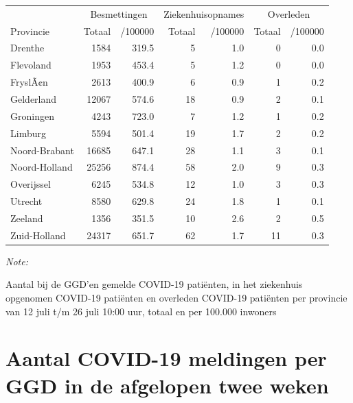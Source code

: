 \documentclass[
  english,
  man,floatsintext]{apa6}
\begin{document}
\begin{table}
\centering
\begin{threeparttable}
\begin{tabular}{lrrrrrr}
\toprule
\multicolumn{1}{c}{ } & \multicolumn{2}{c}{Besmettingen} & \multicolumn{2}{c}{Ziekenhuisopnames} & \multicolumn{2}{c}{Overleden} \\
\cmidrule(l{3pt}r{3pt}){2-3} \cmidrule(l{3pt}r{3pt}){4-5} \cmidrule(l{3pt}r{3pt}){6-7}
Provincie & Totaal & /100000 & Totaal & /100000 & Totaal & /100000\\
\midrule
Drenthe & 1584 & 319.5 & 5 & 1.0 & 0 & 0.0\\
Flevoland & 1953 & 453.4 & 5 & 1.2 & 0 & 0.0\\
FryslÃ¢n & 2613 & 400.9 & 6 & 0.9 & 1 & 0.2\\
Gelderland & 12067 & 574.6 & 18 & 0.9 & 2 & 0.1\\
Groningen & 4243 & 723.0 & 7 & 1.2 & 1 & 0.2\\
Limburg & 5594 & 501.4 & 19 & 1.7 & 2 & 0.2\\
Noord-Brabant & 16685 & 647.1 & 28 & 1.1 & 3 & 0.1\\
Noord-Holland & 25256 & 874.4 & 58 & 2.0 & 9 & 0.3\\
Overijssel & 6245 & 534.8 & 12 & 1.0 & 3 & 0.3\\
Utrecht & 8580 & 629.8 & 24 & 1.8 & 1 & 0.1\\
Zeeland & 1356 & 351.5 & 10 & 2.6 & 2 & 0.5\\
Zuid-Holland & 24317 & 651.7 & 62 & 1.7 & 11 & 0.3\\
\bottomrule
\end{tabular}
\begin{tablenotes}
\item \textit{Note: } 
\item Aantal bij de GGD’en gemelde COVID-19 patiënten, in het ziekenhuis opgenomen COVID-19 patiënten en overleden COVID-19 patiënten per provincie van 12 juli t/m 26 juli 10:00 uur, totaal en per 100.000 inwoners
\end{tablenotes}
\end{threeparttable}
\end{table}

\newpage

\hypertarget{aantal-covid-19-meldingen-per-ggd-in-de-afgelopen-twee-weken}{%
\section{Aantal COVID-19 meldingen per GGD in de afgelopen twee weken}\label{aantal-covid-19-meldingen-per-ggd-in-de-afgelopen-twee-weken}}
\end{document}
